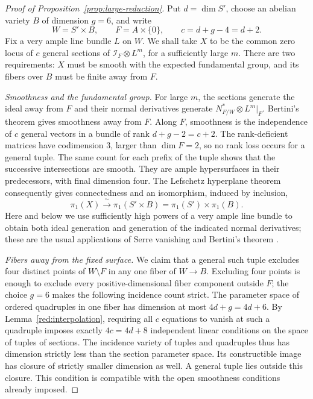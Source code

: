\documentclass[11pt,reqno]{amsart}
\numberwithin{equation}{section}
\theoremstyle{definition}
\theoremstyle{remark}
\begin{document}
\begin{proof}[Proof of Proposition~\ref{prop:large-reduction}]
Put $d=\dim S'$, choose an abelian variety $B$ of dimension $g=6$, and
write
\[
 W=S'\times B,\qquad F=A\times\{0\},\qquad
 c=d+g-4=d+2.
\]
Fix a very ample line bundle $L$ on $W$.  We shall take $X$ to be the
common zero locus of $c$ general sections of
$\mathcal I_F\otimes L^m$, for a sufficiently large $m$.
There are two requirements: $X$ must be smooth with the expected
fundamental group, and its fibers over $B$ must be finite away from $F$.

\smallskip
\noindent\emph{Smoothness and the fundamental group.}
For large $m$, the sections generate the ideal away from $F$ and their
normal derivatives generate
$N^*_{F/W}\otimes L^m|_F$.  Bertini's theorem gives smoothness away
from $F$.  Along $F$, smoothness is the independence of $c$ general
vectors in a bundle of rank $d+g-2=c+2$.  The rank-deficient matrices
have codimension $3$, larger than $\dim F=2$, so no rank loss occurs
for a general tuple.  The same count for each prefix of the tuple
shows that the successive intersections are smooth.  They are ample
hypersurfaces in their predecessors, with final dimension four.
The Lefschetz hyperplane theorem consequently gives connectedness and
an isomorphism, induced by inclusion,
\begin{equation}\label{red:fundamental-group}
 \pi_1(X)\xrightarrow{\ \sim\ }
 \pi_1(S'\times B)=\pi_1(S')\times\pi_1(B).
\end{equation}
Here and below we use sufficiently high powers of a very ample line
bundle to obtain both ideal generation and generation of the indicated
normal derivatives; these are the usual applications of Serre
vanishing and Bertini's theorem \cite{Hartshorne}.

\smallskip
\noindent\emph{Fibers away from the fixed surface.}
We claim that a general such tuple excludes four distinct points of
$W\setminus F$ in any one fiber of $W\to B$.  Excluding four points
is enough to exclude every positive-dimensional fiber component
outside $F$; the choice $g=6$ makes the following incidence count
strict.  The parameter space of
ordered quadruples in one fiber has dimension at most $4d+g=4d+6$.
By Lemma~\ref{red:interpolation}, requiring all $c$ equations to
vanish at such a quadruple imposes exactly $4c=4d+8$ independent
linear conditions on the space of tuples of sections.  The incidence
variety of tuples and quadruples thus has dimension strictly less than
the section parameter space.  Its constructible image has closure of
strictly smaller dimension as well.  A general tuple lies outside this
closure.  This condition is compatible with the open smoothness
conditions already imposed.


\end{proof}
\end{document}
